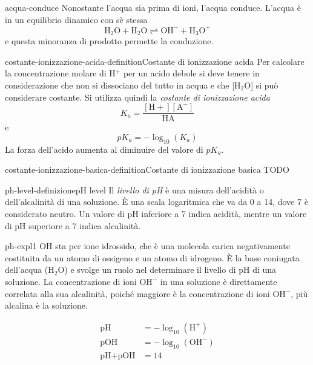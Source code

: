 \documentclass[preview]{standalone}
\begin{document}

\begin{snippet}{acqua-conduce}
    Nonostante l'acqua sia prima di ioni, l'acqua conduce.
    L'acqua è in un equilibrio dinamico con sè stessa
    \[
        \text{H}_2\text{O} + \text{H}_2\text{O} \rightleftharpoons \text{OH}^- + \text{H}_3\text{O}^+
    \]
    e questa minoranza di prodotto permette la conduzione.
\end{snippet}

\begin{snippetdefinition}{costante-ionizzazione-acida-definition}{Costante di ionizzazione acida}
    Per calcolare la concentrazione molare di H\({}^+\) per un acido
    debole si deve tenere in considerazione che non si
    dissociano del tutto in acqua e che [H\({}_2\)O] si può
    considerare costante.
    Si utilizza quindi la \textit{costante di ionizzazione acida}
    \[
        K_a = \frac{[\text{H}+][\text{A}^-]}{\text{HA}}
    \]
    e
    \[
        pK_a=-\log_{10}(K_a)
    \]
    La forza dell'acido aumenta al diminuire del valore di
    \(pK_a\).
\end{snippetdefinition}

\begin{snippetdefinition}{costante-ionizzazione-basica-definition}{Costante di ionizzazione basica}
    TODO
\end{snippetdefinition}

\begin{snippetdefinition}{ph-level-definizione}{pH level}
    Il \textit{livello di pH} è una misura dell'acidità o dell'alcalinità di una soluzione.
    È una scala logaritmica che va da 0 a 14, dove 7 è considerato neutro.
    Un valore di pH inferiore a 7 indica acidità, mentre un valore di pH superiore a 7 indica alcalinità.
\end{snippetdefinition}

\begin{snippet}{ph-expl1}
    OH sta per ione idrossido, che è una molecola carica negativamente costituita da un atomo di ossigeno e un atomo di idrogeno.
    È la base coniugata dell'acqua (\(\text{H}_2\text{O}\)) e svolge un ruolo nel determinare il livello di pH di una soluzione.
    La concentrazione di ioni \(\text{OH}^-\) in una soluzione è direttamente correlata alla sua alcalinità,
    poiché maggiore è la concentrazione di ioni \(\text{OH}^-\), più alcalina è la soluzione.

    \begin{align*}
        \text{pH} &= - \log_{10}(\text{H}^+) \\
        \text{pOH} &= - \log_{10}(\text{OH}^-) \\
        \text{pH} + \text{pOH} &= 14 \\
    \end{align*}
\end{snippet}
\end{document}

